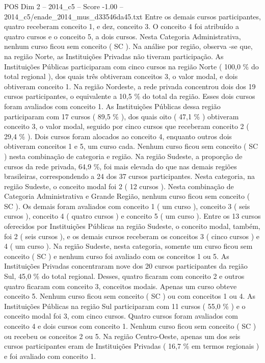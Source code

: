 \begin{textsample}{POS Dim 2 – 2014\_c5 – Score -1.00 – 2014\_c5/enade\_2014\_mus\_d33546da45.txt}
Entre os demais cursos participantes, quatro receberam conceito 1, e dez, conceito 3.
O conceito 4 foi atribuído a quatro cursos e o conceito 5, a dois cursos.
Nesta Categoria Administrativa, nenhum curso ficou sem conceito ( SC ).
Na análise por região, observa -se que, na região Norte, as Instituições Privadas não tiveram participação.
As Instituições Públicas participaram com cinco cursos na região Norte ( 100,0 \% do total regional ), dos quais três obtiveram conceitos 3, o valor modal, e dois obtiveram conceito 1.
Na região Nordeste, a rede privada concentrou dois dos 19 cursos participantes, o equivalente a 10,5 \% do total da região.
Esses dois cursos foram avaliados com conceito 1.
As Instituições Públicas dessa região participaram com 17 cursos ( 89,5 \% ), dos quais oito ( 47,1 \% ) obtiveram conceito 3, o valor modal, seguido por cinco cursos que receberam conceito 2 ( 29,4 \% ).
Dois cursos foram alocados ao conceito 4, enquanto outros dois obtiveram conceitos 1 e 5, um curso cada.
Nenhum curso ficou sem conceito ( SC ) nesta combinação de categoria e região.
Na região Sudeste, a proporção de cursos da rede privada, 64,9 \%, foi mais elevada do que nas demais regiões brasileiras, correspondendo a 24 dos 37 cursos participantes.
Nesta categoria, na região Sudeste, o conceito modal foi 2 ( 12 cursos ).
Nesta combinação de Categoria Administrativa e Grande Região, nenhum curso ficou sem conceito ( SC ).
Os demais foram avaliados com conceito 1 ( um curso ), conceito 3 ( seis cursos ), conceito 4 ( quatro cursos ) e conceito 5 ( um curso ).
Entre os 13 cursos oferecidos por Instituições Públicas na região Sudeste, o conceito modal, também, foi 2 ( seis cursos ), e os demais cursos receberam os conceitos 3 ( cinco cursos ) e 4 ( um curso ).
Na região Sudeste, nesta categoria, somente um curso ficou sem conceito ( SC ) e nenhum curso foi avaliado com os conceitos 1 ou 5.
As Instituições Privadas concentraram nove dos 20 cursos participantes da região Sul, 45,0 \% do total regional.
Desses, quatro ficaram com conceito 2 e outros quatro ficaram com conceito 3, conceitos modais.
Apenas um curso obteve conceito 5.
Nenhum curso ficou sem conceito ( SC ) ou com conceitos 1 ou 4.
As Instituições Públicas na região Sul participaram com 11 cursos ( 55,0 \% ) e o conceito modal foi 3, com cinco cursos.
Quatro cursos foram avaliados com conceito 4 e dois cursos com conceito 1.
Nenhum curso ficou sem conceito ( SC ) ou recebeu os conceitos 2 ou 5.
Na região Centro-Oeste, apenas um dos seis cursos participantes eram de Instituições Privadas ( 16,7 \% em termos regionais ) e foi avaliado com conceito 1.

\end{textsample}
